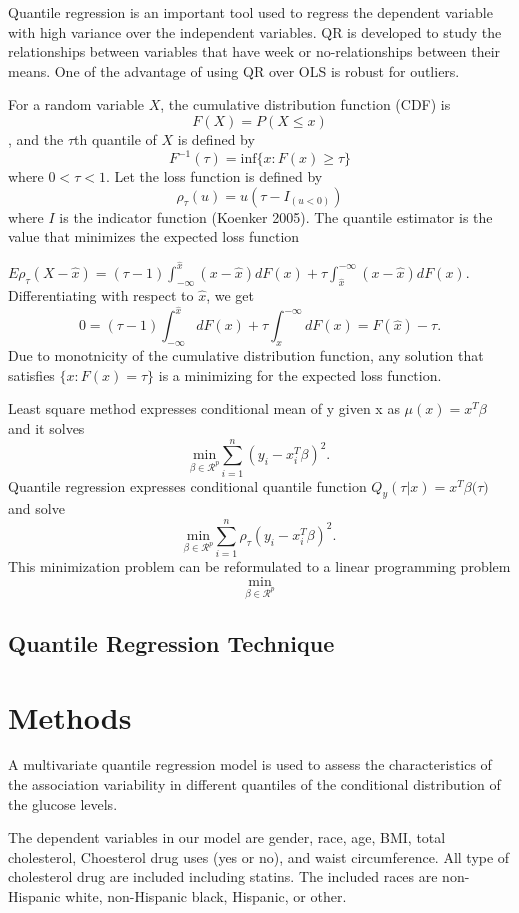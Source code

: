 \documentclass[12pt,]{article}
\begin{document}
Quantile regression is an important tool used to regress the dependent
variable with high variance over the independent variables. QR is
developed to study the relationships between variables that have week or
no-relationships between their means. One of the advantage of using QR
over OLS is robust for outliers.

For a random variable \(X\), the cumulative distribution function (CDF)
is \[F(X)=P(X\leq x)\], and the \(\tau\)th quantile of \(X\) is defined
by \[ F^{-1}(\tau)=\text{inf}\{x: F(x)\ge \tau\} \] where \(0<\tau<1\).
Let the loss function is defined by
\[\rho_{\tau}(u)= u(\tau-I_{(u<0)})\] where \(I\) is the indicator
function (Koenker 2005). The quantile estimator is the value that
minimizes the expected loss function

\(E\rho_{\tau}(X-\hat{x})=(\tau-1)\int_{-\infty}^{\hat{x}} (x-\hat{x})dF(x)+\tau\int_{\hat{x}}^{-\infty} (x-\hat{x})dF(x).\)
Differentiating with respect to \(\hat{x}\), we get
\[ 0  =(\tau-1)\int_{-\infty}^{\hat{x}} dF(x)+\tau\int_{\hat{x}}^{-\infty} dF(x)
=F(\hat{x})-\tau.\] Due to monotnicity of the cumulative distribution
function, any solution that satisfies \(\{x:F(x)=\tau \}\) is a
minimizing for the expected loss function.

Least square method expresses conditional mean of y given x as
\(\mu(x)=x^T\beta\) and it solves
\[ \underset{\beta\in \mathcal{R}^p}{\text{min}}\sum_{i=1}^n(y_i- x_i^T\beta)^2.\]
Quantile regression expresses conditional quantile function
\(Q_y(\tau|x)=x^T \beta ({\tau)}\) and solve
\[ \underset{\beta\in \mathcal{R}^p}{\text{min}}\sum_{i=1}^n\rho_{\tau}(y_i- x_i^T\beta)^2.\]This
minimization problem can be reformulated to a linear programming problem
\[ \underset{\beta\in \mathcal{R}^p}{\text{min}} \]

\subsection{Quantile Regression Technique }

\section{Methods}

A multivariate quantile regression model is used to assess the
characteristics of the association variability in different quantiles of
the conditional distribution of the glucose levels.

The dependent variables in our model are gender, race, age, BMI, total
cholesterol, Choesterol drug uses (yes or no), and waist circumference.
All type of cholesterol drug are included including statins. The
included races are non-Hispanic white, non-Hispanic black, Hispanic, or
other.
\end{document}
